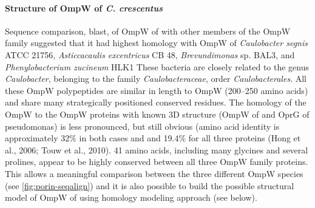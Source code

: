 \paragraph{Structure of OmpW of \textit{C. crescentus}}\label{sub:structompw}
Sequence comparison, \ac{blast}, of OmpW of \caulobacter with other members of the OmpW family suggested that it had highest homology with OmpW of \textit{Caulobacter segnis} ATCC 21756, \textit{Asticcacaulis excentricus} CB 48, \textit{Brevundimonas} sp. BAL3, and \textit{Phenylobacterium zucineum} HLK1 These bacteria are closely related to the genus \textit{Caulobacter}, belonging to the family \textit{Caulobacteraceae}, order \textit{Caulobacterales}. All these OmpW polypeptides are similar in length to \caulobacter OmpW (200--250 amino acids) and share many strategically positioned conserved residues. The homology of the \caulobacter OmpW to the OmpW proteins with known 3D structure (OmpW of \ecoli and OprG of \ac{pseudomonas}) is less pronounced, but still obvious (amino acid identity is approximately 32\% in both cases and and 19.4\% for all three proteins  (Hong et al., 2006; Touw et al., 2010). 41 amino acids, including many glycines and several prolines, appear to be highly conserved between all three OmpW family proteins. This allows a meaningful comparison between the three different OmpW species (see \cref{fig:porin-seqalign}) and it is also possible to build the possible structural model of OmpW of \caulobacter using homology modeling approach (see below). 

